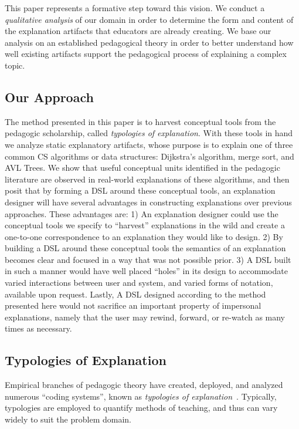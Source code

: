 \documentclass[conference]{IEEEtran}
\begin{document}
This paper represents a formative step toward this vision. We conduct a
\emph{qualitative analysis} of our domain in order to determine the form and
content of the explanation artifacts that educators are already creating. We
base our analysis on an established pedagogical theory in order to better
understand how well existing artifacts support the pedagogical process of
explaining a complex topic.


\subsection{Our Approach}

The method presented in this paper is to harvest conceptual tools from the
pedagogic scholarship, called \emph{typologies of explanation}. With these tools
in hand we analyze static explanatory artifacts, whose purpose is to explain one
of three common CS algorithms or data structures: Dijkstra's algorithm, merge
sort, and AVL Trees. We show that useful conceptual units identified in the
pedagogic literature are observed in real-world explanations of these
algorithms, and then posit that by forming a DSL around these conceptual tools,
an explanation designer will have several advantages in constructing
explanations over previous approaches. These advantages are: 1) An explanation
designer could use the conceptual tools we specify to ``harvest'' explanations
in the wild and create a one-to-one correspondence to an explanation they would
like to design. 2) By building a DSL around these conceptual tools the semantics
of an explanation becomes clear and focused in a way that was not possible
prior. 3) A DSL built in such a manner would have well placed ``holes'' in its
design to accommodate varied interactions between user and system, and varied
forms of notation, available upon request. Lastly, A DSL designed according to
the method presented here would not sacrifice an important property of
impersonal explanations, namely that the user may rewind, forward, or re-watch
as many times as necessary.


\subsection{Typologies of Explanation}

Empirical branches of pedagogic theory have created, deployed, and analyzed
numerous ``coding systems'', known as \emph{typologies of
  explanation}~\cite{westbury1971research, nla.cat-vn407830,
  rosenshine1968objectively, hyman1968teaching, Ennis1969-ENNLIT,
  smith1967language, bellack1966language}. Typically, typologies are employed to
quantify methods of teaching, and thus can vary widely to suit the problem 
domain.
\end{document}
